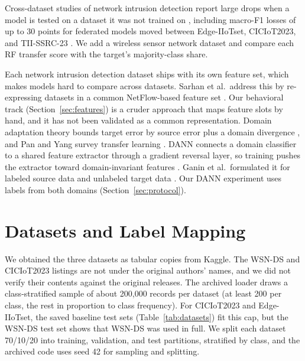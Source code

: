 \documentclass[conference]{IEEEtran}
\begin{document}
Cross-dataset studies of network intrusion detection report large drops when a model is tested on a dataset it was not trained on \cite{dhooge2023,layeghy2022}, including macro-F1 losses of up to 30 points for federated models moved between Edge-IIoTset, CICIoT2023, and TII-SSRC-23 \cite{bilal2026}. We add a wireless sensor network dataset and compare each RF transfer score with the target's majority-class share.

Each network intrusion detection dataset ships with its own feature set, which makes models hard to compare across datasets. Sarhan et al.\ address this by re-expressing datasets in a common NetFlow-based feature set \cite{sarhan2021}. Our behavioral track (Section~\ref{sec:features}) is a cruder approach that maps feature slots by hand, and it has not been validated as a common representation. Domain adaptation theory bounds target error by source error plus a domain divergence \cite{bendavid2010}, and Pan and Yang survey transfer learning \cite{pan2010}. DANN connects a domain classifier to a shared feature extractor through a gradient reversal layer, so training pushes the extractor toward domain-invariant features \cite{ganin2015,ganin2016}. Ganin et al.\ formulated it for labeled source data and unlabeled target data \cite{ganin2016}. Our DANN experiment uses labels from both domains (Section~\ref{sec:protocol}).

\section{Datasets and Label Mapping}\label{sec:data}
We obtained the three datasets as tabular copies from Kaggle. The WSN-DS and CICIoT2023 listings are not under the original authors' names, and we did not verify their contents against the original releases. The archived loader draws a class-stratified sample of about 200{,}000 records per dataset (at least 200 per class, the rest in proportion to class frequency). For CICIoT2023 and Edge-IIoTset, the saved baseline test sets (Table~\ref{tab:datasets}) fit this cap, but the WSN-DS test set shows that WSN-DS was used in full. We split each dataset 70/10/20 into training, validation, and test partitions, stratified by class, and the archived code uses seed 42 for sampling and splitting.
\end{document}
